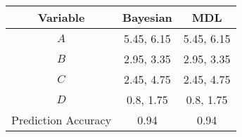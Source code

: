 \scriptsize
\begin{tabular}{@{}ccc@{}}
    \toprule
    Variable & Bayesian & MDL \\
    \midrule
    $A$ & \num{5.45}, \num{6.15} & \num{5.45}, \num{6.15} \\
    $B$ & \num{2.95}, \num{3.35} & \num{2.95}, \num{3.35} \\
    $C$ & \num{2.45}, \num{4.75} & \num{2.45}, \num{4.75} \\
    $D$ & \num{0.8}, \num{1.75} & \num{0.8}, \num{1.75} \\
    \midrule
    Prediction Accuracy & \num{0.94} & \num{0.94} \\
    \bottomrule
\end{tabular}